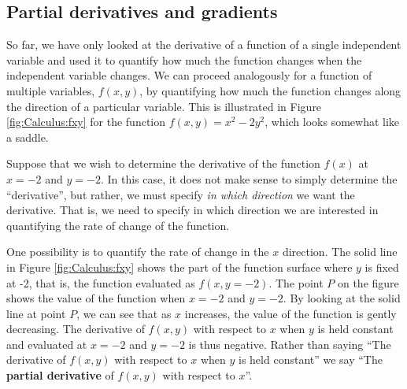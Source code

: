 \subsection{Partial derivatives and gradients}
So far, we have only looked at the derivative of a function of a single independent variable and used it to quantify how much the function changes when the independent variable changes. We can proceed analogously for a function of multiple variables, $f(x,y)$, by quantifying how much the function changes along the direction of a particular variable. This is illustrated in Figure \ref{fig:Calculus:fxy} for the function $f(x,y)=x^2-2y^2$, which looks somewhat like a saddle. 


Suppose that we wish to determine the derivative of the function $f(x)$ at $x=-2$ and $y=-2$. In this case, it does not make sense to simply determine the ``derivative'', but rather, we must specify \textit{in which direction} we want the derivative. That is, we need to specify in which direction we are interested in quantifying the rate of change of the function.

One possibility is to quantify the rate of change in the $x$ direction. The solid line in Figure \ref{fig:Calculus:fxy} shows the part of the function surface where $y$ is fixed at -2, that is, the function evaluated as $f(x,y=-2)$. The point $P$ on the figure shows the value of the function when $x=-2$ and $y=-2$. By looking at the solid line at point $P$, we can see that as $x$ increases, the value of the function is gently decreasing. The derivative of $f(x,y)$ with respect to $x$ when $y$ is held constant and evaluated at $x=-2$ and $y=-2$ is thus negative. Rather than saying ``The derivative of $f(x,y)$ with respect to $x$ when $y$ is held constant'' we say ``The \textbf{partial derivative} of $f(x,y)$ with respect to $x$''.

